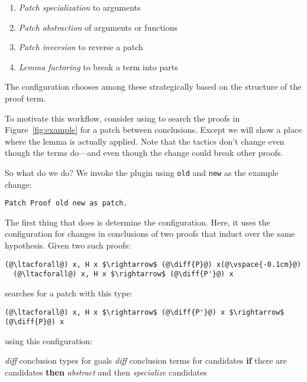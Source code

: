 \begin{enumerate}
\item \textit{Patch specialization} to arguments
\item \textit{Patch abstraction} of arguments or functions
\item \textit{Patch inversion} to reverse a patch
\item \textit{Lemma factoring} to break a term into parts
\end{enumerate}
The configuration chooses among these strategically based on the structure of the proof term.

To motivate this workflow, consider using \sysname to search the proofs in
Figure~\ref{fig:example} for a patch between conclusions.
Except we will show a place where the lemma is actually applied.
Note that the tactics don't change even though the terms do---and even though the change could break other proofs.

So what do we do?
We invoke the plugin using \lstinline{old} and \lstinline{new} as the example change:

\begin{lstlisting}[language=ml4]
  Patch Proof old new as patch.
\end{lstlisting}

The first thing that \sysname does is determine the configuration.
Here, it uses the configuration for changes in conclusions of two proofs
that induct over the same hypothesis. Given two such
proofs:

\begin{lstlisting}[language=coq]
  (@\ltacforall@) x, H x $\rightarrow$ (@\diff{P}@) x(@\vspace{-0.1cm}@)
  (@\ltacforall@) x, H x $\rightarrow$ (@\diff{P'}@) x
\end{lstlisting}
\sysname searches for a patch with this type:

\begin{lstlisting}[language=coq]
  (@\ltacforall@) x, H x $\rightarrow$ (@\diff{P'}@) x $\rightarrow$ (@\diff{P}@) x
\end{lstlisting}
using this configuration:

\begin{algorithm}
\footnotesize
\begin{algorithmic}[1]
    \STATE \textit{diff} conclusion types for goals
    \STATE \textit{diff} conclusion terms for candidates
    \STATE \textbf{if} there are candidates \textbf{then}
    \STATE \hspace*{1em} \textit{abstract} and then \textit{specialize} candidates
\end{algorithmic}
\end{algorithm}


